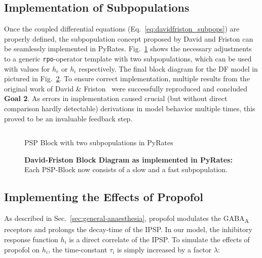 \subsection{Implementation of Subpopulations}\label{subsec:implementation-of-subpopulations}
Once the coupled differential equations (Eq.~\ref{eq:davidfriston_subpops}) are properly defined,
the subpopulation concept proposed by David and Friston can be seamlessly implemented in PyRates.
Fig.~\ref{fig:subpop_pyrates} shows the necessary adjustments to a generic \texttt{rpo}-operator template
with two subpopulations,
which can be used with values for $h_e$ or $h_i$ respectively.
The final block diagram for the DF model in pictured in Fig.~\ref{fig:pyratesDFBlock}.
To ensure correct implementation,
multiple results from the original work of David \& Friston~\cite[Fig. 4, Fig. 5, Fig. 6]{david_neural_2003}
were successfully reproduced and concluded \textbf{Goal 2}.
As errors in implementation caused crucial (but without direct comparison hardly detectable) derivations in model behavior
multiple times, this proved to be an invaluable feedback step.

\begin{figure}[H]

        \inputminted[mathescape, frame=lines, linenos, fontsize=\footnotesize, baselinestretch=1.2,
            bgcolor=LightGray, tabsize=4]
        {python3}{Chapters/Chapter_02_Theoretical_Concepts/code/psp_subpop.py}

	\caption{PSP Block with two subpopulations in PyRates}\label{fig:subpop_pyrates}
\end{figure}

\begin{figure}[H]
    
    \caption{\textbf{David-Friston Block Diagram as implemented in PyRates:}\\
        Each PSP-Block now consists of a slow and a fast subpopulation.
    }
    \label{fig:pyratesDFBlock}
\end{figure}


\subsection{Implementing the Effects of Propofol}\label{subsec:implementing-the-effects-of-propofol}

As described in Sec.~\ref{sec:general-anaesthesia},
propofol modulates the GABA\textsubscript{A} receptors and prolongs the decay-time of the IPSP.
In our model, the inhibitory response function $h_i$ is a direct correlate of the IPSP.
To simulate the effects of propofol on $h_i$, the time-constant $\tau_i$ is simply increased by a factor
$\lambda$:

